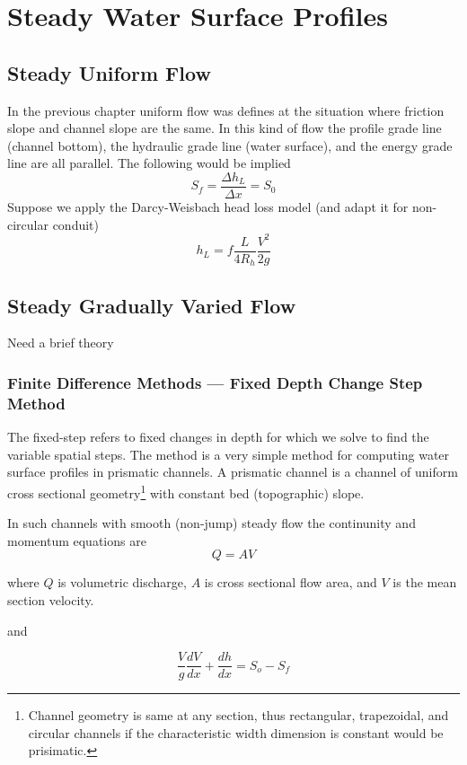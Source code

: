 \section{Steady Water Surface Profiles}
\subsection{Steady Uniform Flow}
In the previous chapter uniform flow was defines at the situation where friction slope and channel slope are the same.  
In this kind of flow the profile grade line (channel bottom), the hydraulic grade line (water surface), and the energy grade line are all parallel.
The following would be implied
\begin{equation}
S_f = \frac{\Delta h_L}{\Delta x} = S_0
\end{equation}
Suppose we apply the Darcy-Weisbach head loss model (and adapt it for non-circular conduit)
\begin{equation}
h_L = f \frac{L}{4R_h} \frac{V^2}{2g}
\end{equation}


\subsection{Steady Gradually Varied Flow}
Need a brief theory
\subsubsection{Finite Difference Methods --- Fixed Depth Change Step Method}
The fixed-step refers to fixed changes in depth for which we solve to find the variable spatial steps.
The method is a very simple method for computing water surface profiles in prismatic channels.
A prismatic channel is a channel of uniform cross sectional geometry\footnote{Channel geometry is same at any section, thus rectangular, trapezoidal, and circular channels if the characteristic width dimension is constant would be prisimatic.} with constant bed (topographic) slope.  

In such channels with smooth (non-jump) steady flow the continunity and momentum equations are 
\begin{equation}
Q=AV
\end{equation}

where $Q$ is volumetric discharge, $A$ is cross sectional flow area, and $V$ is the mean section velocity.

and

\begin{equation}
\frac{V}{g}\frac{dV}{dx}+\frac{dh}{dx}=S_o - S_f
\end{equation}

